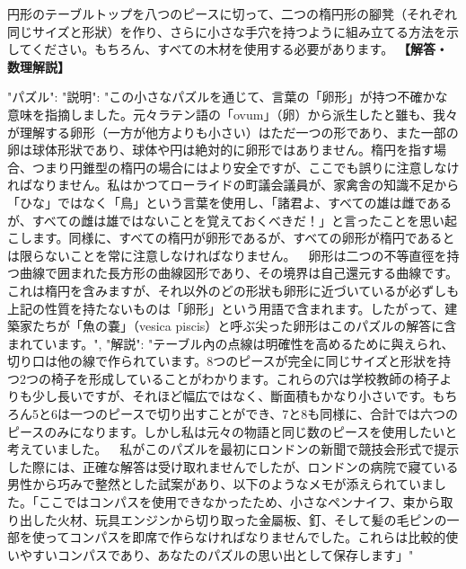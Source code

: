 \documentclass[10pt,a4paper,oneside,openany]{ltjsbook}
\begin{document}
\begin{tcolorbox}[colback=softblue,colframe=primaryblue,title=\textbf{第 157 問：THE TABLE-TOP AND STOOLS.},arc=2mm,boxrule=1pt,breakable]
円形のテーブルトップを八つのピースに切って、二つの楕円形の腳凳（それぞれ同じサイズと形狀）を作り、さらに小さな手穴を持つように組み立てる方法を示してください。もちろん、すべての木材を使用する必要があります。
\tcblower
\textbf{【解答・数理解説】}\par\vspace{0.3em}
{
  "パズル": {
    "説明": "この小さなパズルを通じて、言葉の「卵形」が持つ不確かな意味を指摘しました。元々ラテン語の「ovum」（卵）から派生したと雖も、我々が理解する卵形（一方が他方よりも小さい）はただ一つの形であり、また一部の卵は球体形狀であり、球体や円は絶対的に卵形ではありません。楕円を指す場合、つまり円錐型の楕円の場合にはより安全ですが、ここでも誤りに注意しなければなりません。私はかつてローライドの町議会議員が、家禽舎の知識不足から「ひな」ではなく「鳥」という言葉を使用し、「諸君よ、すべての雄は雌であるが、すべての雌は雄ではないことを覚えておくべきだ！」と言ったことを思い起こします。同様に、すべての楕円が卵形であるが、すべての卵形が楕円であるとは限らないことを常に注意しなければなりません。\
\
卵形は二つの不等直徑を持つ曲線で囲まれた長方形の曲線図形であり、その境界は自己還元する曲線です。これは楕円を含みますが、それ以外のどの形狀も卵形に近づいているが必ずしも上記の性質を持たないものは「卵形」という用語で含まれます。したがって、建築家たちが「魚の嚢」（vesica piscis）と呼ぶ尖った卵形はこのパズルの解答に含まれています。",
    "解説": "テーブル內の点線は明確性を高めるために與えられ、切り口は他の線で作られています。8つのピースが完全に同じサイズと形狀を持つ2つの椅子を形成していることがわかります。これらの穴は学校教師の椅子よりも少し長いですが、それほど幅広ではなく、斷面積もかなり小さいです。もちろん5と6は一つのピースで切り出すことができ、7と8も同様に、合計では六つのピースのみになります。しかし私は元々の物語と同じ数のピースを使用したいと考えていました。\
\
私がこのパズルを最初にロンドンの新聞で競技会形式で提示した際には、正確な解答は受け取れませんでしたが、ロンドンの病院で寢ている男性から巧みで整然とした試案があり、以下のようなメモが添えられていました。「ここではコンパスを使用できなかったため、小さなペンナイフ、束から取り出した火材、玩具エンジンから切り取った金屬板、釘、そして髪の毛ピンの一部を使ってコンパスを即席で作らなければなりませんでした。これらは比較的使いやすいコンパスであり、あなたのパズルの思い出として保存します」"
  }
}
\end{tcolorbox}
\end{document}
